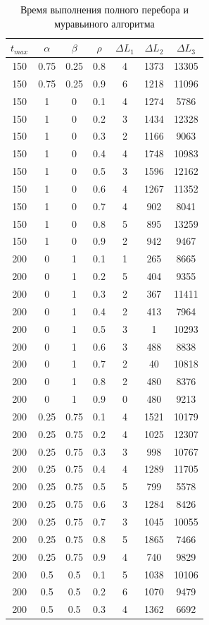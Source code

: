\documentclass[a4paper,oneside,14pt]{extreport}
\begin{document}
\begin{table}[H]
\begin{center}
	\caption[]{\label{tbl:only} Время выполнения полного перебора и муравьиного алгоритма}
	\begin{tabular}{|c|c|c|c|c|c|c|}
		\hline
		$t_{max}$ & $\alpha$ & $\beta$ & $\rho$ & $\Delta L_{1}$ & $\Delta L_{2}$ & $\Delta L_{3}$\\
		\hline
		150 & 0.75 & 0.25 & 0.8 & 4 & 1373 & 13305 \\
		150 & 0.75 & 0.25 & 0.9 & 6 & 1218 & 11096 \\
		150 & 1 & 0 & 0.1 & 4 & 1274 & 5786 \\
		150 & 1 & 0 & 0.2 & 3 & 1434 & 12328 \\
		150 & 1 & 0 & 0.3 & 2 & 1166 & 9063 \\
		150 & 1 & 0 & 0.4 & 4 & 1748 & 10983 \\
		150 & 1 & 0 & 0.5 & 3 & 1596 & 12162 \\
		150 & 1 & 0 & 0.6 & 4 & 1267 & 11352 \\
		150 & 1 & 0 & 0.7 & 4 & 902 & 8041 \\
		150 & 1 & 0 & 0.8 & 5 & 895 & 13259 \\
		150 & 1 & 0 & 0.9 & 2 & 942 & 9467 \\
		200 & 0 & 1 & 0.1 & 1 & 265 & 8665 \\
		200 & 0 & 1 & 0.2 & 5 & 404 & 9355 \\
		200 & 0 & 1 & 0.3 & 2 & 367 & 11411 \\
		200 & 0 & 1 & 0.4 & 2 & 413 & 7964 \\
		200 & 0 & 1 & 0.5 & 3 & 1 & 10293 \\
		200 & 0 & 1 & 0.6 & 3 & 488 & 8838 \\
		200 & 0 & 1 & 0.7 & 2 & 40 & 10818 \\
		200 & 0 & 1 & 0.8 & 2 & 480 & 8376 \\
		200 & 0 & 1 & 0.9 & 0 & 480 & 9213 \\
		200 & 0.25 & 0.75 & 0.1 & 4 & 1521 & 10179 \\
		200 & 0.25 & 0.75 & 0.2 & 4 & 1025 & 12307 \\
		200 & 0.25 & 0.75 & 0.3 & 3 & 998 & 10767 \\
		200 & 0.25 & 0.75 & 0.4 & 4 & 1289 & 11705 \\
		200 & 0.25 & 0.75 & 0.5 & 5 & 799 & 5578 \\
		200 & 0.25 & 0.75 & 0.6 & 3 & 1284 & 8426 \\
		200 & 0.25 & 0.75 & 0.7 & 3 & 1045 & 10055 \\
		200 & 0.25 & 0.75 & 0.8 & 5 & 1865 & 7466 \\
		200 & 0.25 & 0.75 & 0.9 & 4 & 740 & 9829 \\
		200 & 0.5 & 0.5 & 0.1 & 5 & 1038 & 10106 \\
		200 & 0.5 & 0.5 & 0.2 & 6 & 1070 & 9479 \\
		200 & 0.5 & 0.5 & 0.3 & 4 & 1362 & 6692 \\
		\hline
	\end{tabular}
\end{center}
\end{table}
\end{document}
